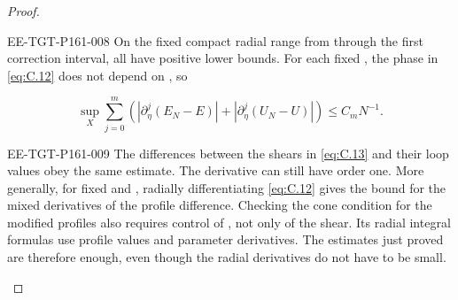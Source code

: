 \begin{proof}
\begin{EESegment}{EE-TGT-P161-008}
On the fixed compact radial range from  through the first correction interval,
all have positive lower bounds. For each fixed , the phase in \eqref{eq:C.12} does not depend on
, so
\end{EESegment}
\begin{equation}
 \sup_X\sum_{j=0}^m
 \left(\left|\partial_\eta^j(E_N-E)\right|
       +\left|\partial_\eta^j(U_N-U)\right|\right)
 \leq C_mN^{-1}.
\tag{C.14}\label{eq:C.14}
\end{equation}
\begin{EESegment}{EE-TGT-P161-009}
The differences between the shears in \eqref{eq:C.13} and their loop values obey the same estimate. The derivative  can still have order one. More generally, for fixed
 and ,
radially differentiating \eqref{eq:C.12} gives the bound  for the mixed derivatives of the profile
difference. Checking the cone condition for the modified profiles also requires control of , not only of the shear. Its radial integral formulas use profile values and parameter derivatives. The estimates just proved are therefore enough, even though the radial derivatives do not have to be small.
\end{EESegment}


\end{proof}
